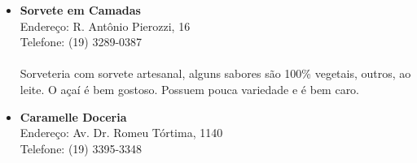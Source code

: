 \begin{itemize}
\item \textbf{Sorvete em Camadas}
  \\Endereço: R. Antônio Pierozzi, 16
  \\Telefone: (19) 3289-0387
  \\
  \\Sorveteria com sorvete artesanal, alguns sabores são 100\% vegetais,
  outros, ao leite. O açaí é bem gostoso. Possuem pouca variedade e é bem
  caro.
\item \textbf{Caramelle Doceria}
  \\Endereço: Av. Dr. Romeu Tórtima, 1140
  \\Telefone: (19) 3395-3348
\end{itemize}
